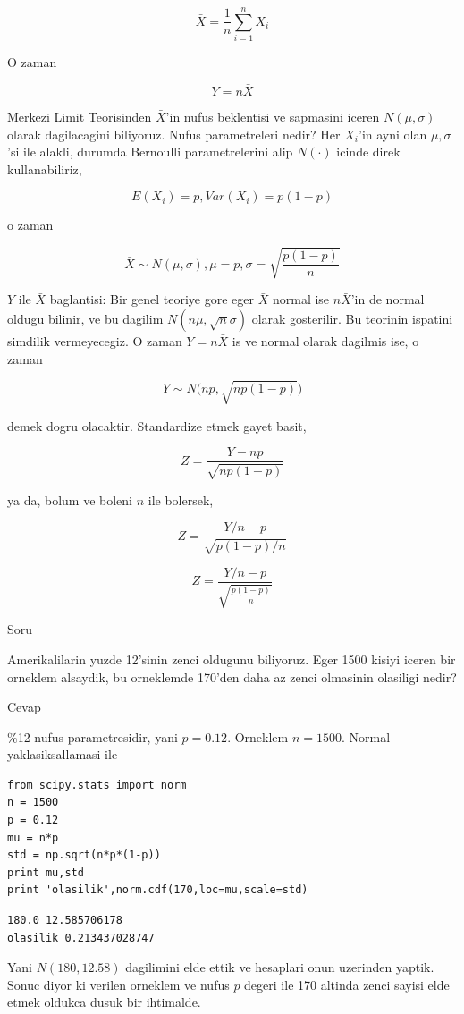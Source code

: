 \documentclass[12pt,fleqn]{article}\usepackage{../common}
\begin{document}
$$ \bar{X} = \frac{1}{n}  \sum_{i=1}^n X_i $$

O zaman 

$$ Y = n\bar{X}  $$

Merkezi Limit Teorisinden $\bar{X}$'in nufus beklentisi ve sapmasini iceren
$N(\mu,\sigma)$ olarak dagilacagini biliyoruz. Nufus parametreleri nedir?
Her $X_i$'in ayni olan $\mu,\sigma$'si ile alakli, durumda Bernoulli
parametrelerini alip $N(\cdot)$ icinde direk kullanabiliriz, 

$$E(X_i) = p, Var(X_i) = p(1-p)$$

o zaman 

$$\bar{X} \sim N(\mu,\sigma), \mu = p, \sigma = \sqrt{\frac{p(1-p)}{n}}$$

$Y$ ile $\bar{X}$ baglantisi: Bir genel teoriye gore eger $\bar{X}$ normal
ise $n\bar{X}$'in de normal oldugu bilinir, ve bu dagilim
$N(n\mu,\sqrt{n}\sigma)$ olarak gosterilir. Bu teorinin ispatini simdilik
vermeyecegiz. O zaman $Y = n\bar{X}$ is ve normal olarak dagilmis ise, o zaman 

$$ Y \sim N\bigg(np, \sqrt{np(1-p)}\bigg)$$

demek dogru olacaktir. Standardize etmek gayet basit,


$$Z  = \frac{Y - np}{\sqrt{np(1-p)}}$$

ya da, bolum ve boleni $n$ ile bolersek,

$$Z  = \frac{Y/n - p}{\sqrt{p(1-p)/n}}$$


$$Z  = \frac{Y/n - p}{\sqrt{\frac{p(1-p)}{n}}}$$

Soru

Amerikalilarin yuzde 12'sinin zenci oldugunu biliyoruz. Eger 1500 kisiyi
iceren bir orneklem alsaydik, bu orneklemde 170'den daha az zenci
olmasinin olasiligi nedir? 

Cevap

\%12 nufus parametresidir, yani $p=0.12$. Orneklem $n=1500$. Normal
yaklasiksallamasi ile 

\begin{verbatim}
from scipy.stats import norm
n = 1500
p = 0.12
mu = n*p
std = np.sqrt(n*p*(1-p))
print mu,std
print 'olasilik',norm.cdf(170,loc=mu,scale=std)
\end{verbatim}

\begin{verbatim}
180.0 12.585706178
olasilik 0.213437028747
\end{verbatim}

Yani $N(180,12.58)$ dagilimini elde ettik ve hesaplari onun uzerinden
yaptik. Sonuc diyor ki verilen orneklem ve nufus $p$ degeri ile 170 altinda
zenci sayisi elde etmek oldukca dusuk bir ihtimalde. 
\end{document}
